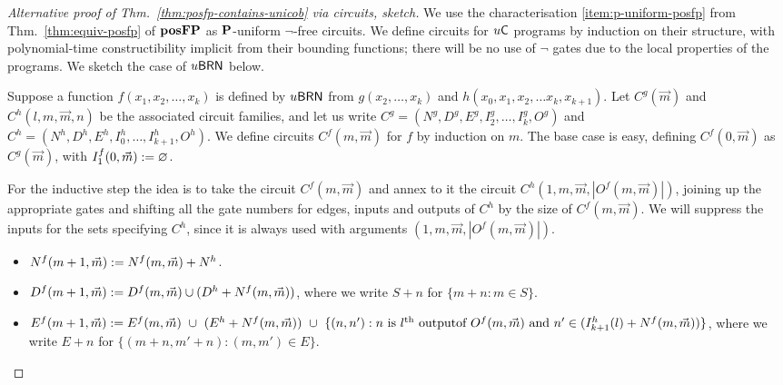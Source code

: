 \documentclass{lmcs}
\begin{document}
\begin{proof}
	[Alternative proof of Thm.~\ref{thm:posfp-contains-unicob} via circuits, sketch]
	We use the characterisation \ref{item:p-uniform-posfp} from Thm.~\ref{thm:equiv-posfp} of $\mathbf{pos}\mathbf{FP}$ as $\mathbf{P}$-uniform $\neg$-free circuits.
	We define circuits for $u \mathsf{C}$ programs by induction on their structure, with polynomial-time constructibility implicit from their bounding functions; there will be no use of $\neg$ gates
	due to the local properties of the programs.
	We sketch the case of $u\mathsf{BRN}$ below.
	
	Suppose a function $f(x_1 , x_2, \dots , x_k)$ is defined by $u\mathsf{BRN}$ from $g(x_2, \dots , x_k)$ and $ h(x_0,x_1,x_2, \dots x_k, x_{k+1})$.
	Let $C^g(\vec m) $ and $C^h(l, m , \vec m , n)$ be the associated circuit families, and let us write $C^g = (N^g, D^g, E^g, I^g_2, \dots , I^g_k ,O^g )$ and $C^h =(N^h, D^h , E^h , I^h_0, \dots , I^h_{k+1} , O^h)$. We define circuits $C^f(m, \vec m )$ for $f$ by induction on $m$.
	The base case is easy, defining $C^f(0, \vec m)$ as $C^g (\vec m)$, with $I^f_1 (0, \vec m) := \varnothing$.
	
	For the inductive step the idea is to take the circuit $C^f(m,\vec m)$ and annex to it the circuit $C^h(1, m , \vec m, |O^f (m, \vec m)|)$, joining up the appropriate gates and shifting all the gate numbers for edges, inputs and outputs of $C^h$ by the size of $C^f (m, \vec m)$.
	We will suppress the inputs for the sets specifying $C^h$, since it is always used with arguments $(1,m,\vec m , |O^f (m, \vec m)|)$.
	\begin{itemize}
		\item $N^f (m+1, \vec m) := N^f (m, \vec m) + N^h $.
		\item $D^f (m+1 , \vec m) := D^f (m, \vec m) \cup (D^h  + N^f (m, \vec m)  )$, where we write $S+n$ for $ \{ m +n: m \in S \}$.
		\item $E^f (m+1 , \vec m) \dfn 
		E^f (m , \vec m) 
		\ \cup \ (E^h
		+ N^f (m, \vec m)) 
		\ \cup\ 
		\{ (n,n') : \text{$n$ is $l$\textsuperscript{th} output} \linebreak \text{of $O^f (m, \vec m)$ and $n' \in (I^h_{k+1}(l) + N^f(m, \vec m))$} \}
		$, where we write $E+n $ for $\{ (m+n,m'+n) : (m , m') \in E \}$. 
		

\end{itemize}
\end{proof}
\end{document}
